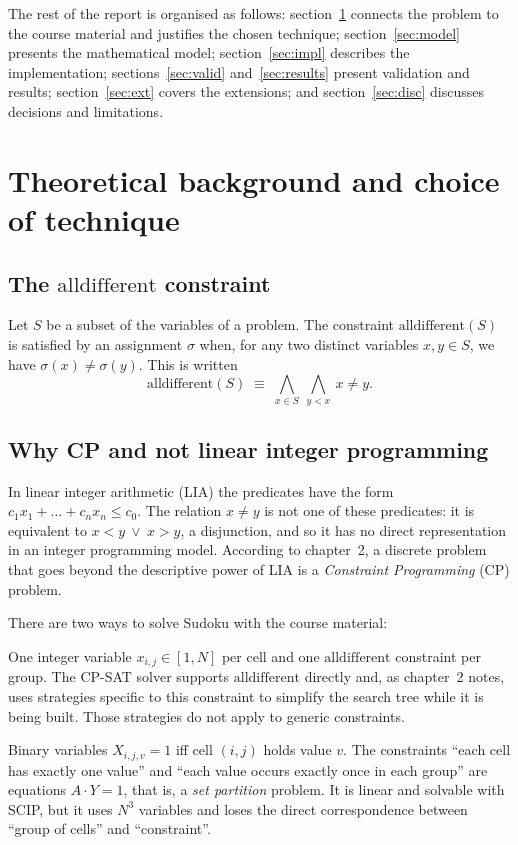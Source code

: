 \documentclass[11pt,a4paper]{article}
\newcommand{\alldiff}{\mathrm{alldifferent}}
\begin{document}
The rest of the report is organised as follows: section~\ref{sec:theory} connects the problem to the course material and justifies the chosen technique; section~\ref{sec:model} presents the mathematical model; section~\ref{sec:impl} describes the implementation; sections~\ref{sec:valid} and~\ref{sec:results} present validation and results; section~\ref{sec:ext} covers the extensions; and section~\ref{sec:disc} discusses decisions and limitations.

\section{Theoretical background and choice of technique}\label{sec:theory}

\subsection{The \texorpdfstring{$\alldiff$}{alldifferent} constraint}

Let $S$ be a subset of the variables of a problem. The constraint $\alldiff(S)$ is satisfied by an assignment $\sigma$ when, for any two distinct variables $x,y\in S$, we have $\sigma(x)\neq\sigma(y)$. This is written
\[
  \alldiff(S)\;\equiv\;\bigwedge_{x\in S}\ \bigwedge_{y<x}\ x\neq y .
\]

\subsection{Why CP and not linear integer programming}

In linear integer arithmetic (LIA) the predicates have the form $c_1x_1+\dots+c_nx_n\le c_0$. The relation $x\neq y$ is not one of these predicates: it is equivalent to $x<y\ \vee\ x>y$, a disjunction, and so it has no direct representation in an integer programming model. According to chapter~2, a discrete problem that goes beyond the descriptive power of LIA is a \emph{Constraint Programming} (CP) problem.

There are two ways to solve Sudoku with the course material:

\begin{description}[leftmargin=1.5em]
  \item[CP model (chosen).] One integer variable $x_{i,j}\in[1,N]$ per cell and one $\alldiff$ constraint per group. The CP-SAT solver supports $\alldiff$ directly and, as chapter~2 notes, uses strategies specific to this constraint to simplify the search tree while it is being built. Those strategies do not apply to generic constraints.
  \item[BIP model (alternative, not followed).] Binary variables $X_{i,j,v}=1$ iff cell $(i,j)$ holds value $v$. The constraints ``each cell has exactly one value'' and ``each value occurs exactly once in each group'' are equations $A\cdot Y=1$, that is, a \emph{set partition} problem. It is linear and solvable with SCIP, but it uses $N^3$ variables and loses the direct correspondence between ``group of cells'' and ``constraint''.
\end{description}
\end{document}
